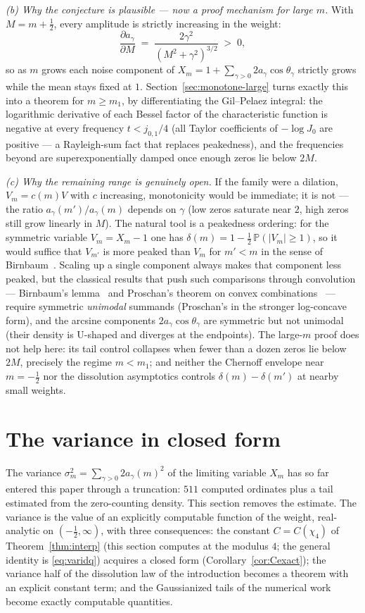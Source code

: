 \documentclass[11pt]{article}
\begin{document}
\emph{(b) Why the conjecture is plausible --- now a proof mechanism
for large $m$.} With $M=m+\tfrac12$, every amplitude is strictly
increasing in the weight:
\[
\frac{\partial a_\gamma}{\partial M}
\;=\;\frac{2\gamma^2}{(M^2+\gamma^2)^{3/2}}\;>\;0 ,
\]
so as $m$ grows each noise component of
$X_m=1+\sum_{\gamma>0}2a_\gamma\cos\theta_\gamma$ strictly grows while
the mean stays fixed at $1$. Section~\ref{sec:monotone-large} turns
exactly this into a theorem for $m\ge m_1$, by differentiating the
Gil--Pelaez integral: the logarithmic derivative of each Bessel factor
of the characteristic function is negative at every frequency
$t<j_{0,1}/4$ (all Taylor coefficients of $-\log J_0$ are positive ---
a Rayleigh-sum fact that replaces peakedness), and the frequencies
beyond are superexponentially damped once enough zeros lie below
$2M$.

\emph{(c) Why the remaining range is genuinely open.} If the family
were a dilation, $V_{m}=c(m)V$ with $c$ increasing, monotonicity would
be immediate; it is not --- the ratio $a_\gamma(m')/a_\gamma(m)$
depends on $\gamma$ (low zeros saturate near $2$, high zeros still
grow linearly in $M$). The natural tool is a peakedness ordering: for
the symmetric variable $V_m=X_m-1$ one has
$\delta(m)=1-\tfrac12\,\mathbb P(|V_m|\ge1)$, so it would suffice that
$V_{m'}$ is more peaked than $V_m$ for $m'<m$ in the sense of
Birnbaum~\cite{Bir48}. Scaling up a single component always makes
that component less peaked, but the classical results that push such
comparisons through convolution --- Birnbaum's lemma~\cite{Bir48} and
Proschan's theorem on convex combinations~\cite{Pro65} --- require
symmetric \emph{unimodal} summands (Proschan's in the stronger
log-concave form), and the arcsine components
$2a_\gamma\cos\theta_\gamma$ are symmetric but not unimodal (their
density is U-shaped and diverges at the endpoints). The
large-$m$ proof does not help here: its tail control collapses when
fewer than a dozen zeros lie below $2M$, precisely the regime
$m<m_1$; and neither the Chernoff envelope near $m=-\tfrac12$ nor the
dissolution asymptotics controls $\delta(m)-\delta(m')$ at nearby
small weights.

\section{The variance in closed form}\label{sec:variance}

The variance
$\sigma_m^2=\sum_{\gamma>0}2a_\gamma(m)^2$ of the limiting variable
$X_m$ has so far entered this paper through a truncation: $511$
computed ordinates plus a tail estimated from the zero-counting
density. This section removes the estimate. The variance is the value
of an explicitly computable function of the weight, real-analytic on
$(-\tfrac12,\infty)$, with three
consequences: the constant $C=C(\chi_4)$ of Theorem~\ref{thm:interp}
(this section computes at the modulus $4$; the general identity is
\eqref{eq:varidq}) acquires a
closed form (Corollary~\ref{cor:Cexact});
the variance half of the dissolution law of the introduction becomes a
theorem with an explicit constant term; and the Gaussianized tails of
the numerical work become exactly computable quantities.
\end{document}
